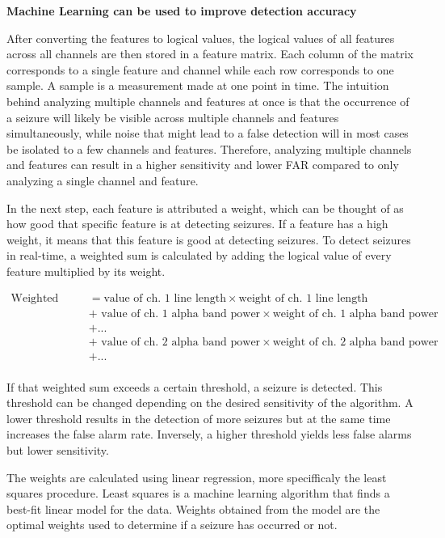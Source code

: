 \documentclass[usletter, 11pt]{extarticle}
\begin{document}
\vspace{11pt}
\textbf{Machine Learning can be used to improve detection accuracy}

After converting the features to logical values, the logical values of all features across all channels are then stored in a feature matrix. Each column of the matrix corresponds to a single feature and channel while each row corresponds to one sample. A sample is a measurement made at one point in time. The intuition behind analyzing multiple channels and features at once is that the occurrence of a seizure will likely be visible across multiple channels and features simultaneously, while noise that might lead to a false detection will in most cases be isolated to a few channels and features. Therefore, analyzing multiple channels and features can result in a higher sensitivity and lower FAR compared to only analyzing a single channel and feature.

In the next step, each feature is attributed a weight, which can be thought of as how good that specific feature is at detecting seizures. If a feature has a high weight, it means that this feature is good at detecting seizures. To detect seizures in real-time, a weighted sum is calculated by adding the logical value of every feature multiplied by its weight.

\begin{mdframed}
\begin{align*}
	\text{Weighted sum} &= \text{value of ch. 1  line length} \times \text{weight of ch. 1 line length} \\
	&+ \text{ value of ch. 1  alpha band power} \times \text{weight of ch. 1 alpha band power} \\
	&+ ...  \\
	&+ \text{ value of ch. 2  alpha band power} \times \text{weight of ch. 2 alpha band power} \\
	&+ ...  \\
\end{align*}
\end{mdframed}
If that weighted sum exceeds a certain threshold, a seizure is detected. This threshold can be changed depending on the desired sensitivity of the algorithm. A lower threshold results in the detection of more seizures but at the same time increases the false alarm rate. Inversely, a higher threshold yields less false alarms but lower sensitivity.

The weights are calculated using linear regression, more specifficaly the least squares procedure. Least squares is a machine learning algorithm that finds a best-fit linear model for the data. Weights obtained from the model are the optimal weights used to determine if a seizure has occurred or not.
\end{document}
